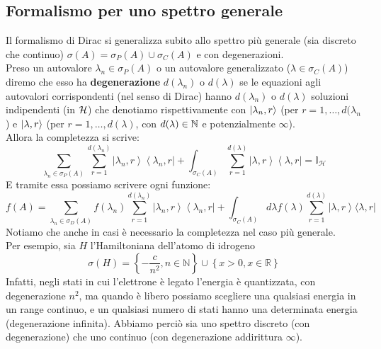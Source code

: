 \documentclass[../../FisicaTeorica.tex]{subfiles}
\begin{document}
\subsection{Formalismo per uno spettro generale}
Il formalismo di Dirac si generalizza subito allo spettro più generale (sia discreto che continuo) $\sigma \left(A\right)= \sigma_P(A)\cup \sigma_C\left(A\right)$ e con degenerazioni.\\
Preso un autovalore $\lambda_n\in \sigma_P(A)$ o un autovalore generalizzato ($\lambda \in \sigma_C(A)$) diremo che esso ha \textbf{degenerazione} $d(\lambda_n)$ o $d\left(\lambda\right)$ se le equazioni agli autovalori corrispondenti (nel senso di Dirac) hanno $d\left(\lambda_n\right)$ o $d\left(\lambda\right)$ soluzioni indipendenti (in $\mathcal{H}$) che denotiamo rispettivamente con $\ket{\lambda_{n}, r}$ (per $r=1,\dots, d(\lambda_n$) e $\ket{\lambda, r}$ (per $r = 1,\dots, d(\lambda)$, con $d(\lambda) \in \mathbb{N}$ e potenzialmente $\infty$).\\ 
Allora la completezza si scrive:
\[
\sum_{\lambda_n\in\sigma_P\left(A\right)}\sum_{r=1}^{d\left(\lambda_n\right)}{\left|\lambda_n,r\right\rangle\left\langle\lambda_n,r\right|+\int_{\sigma_C\left(A\right)}\sum_{r=1}^{d\left(\lambda\right)}\left|\lambda,r\right\rangle\left\langle\lambda,r\right|=\mathbb{I}_\mathcal{H}}
\]
E tramite essa possiamo scrivere ogni funzione:
\[
f\left(A\right)= \sum_{\lambda_n\in\sigma_D\left(A\right)} f\left(\lambda_n\right)\sum_{r=1}^{d\left(\lambda_n\right)}\left|\lambda_n,r\right\rangle\left\langle\lambda_n,r\right|+\int_{\sigma_C\left(A\right)}{d\lambda f\left(\lambda\right)}\sum_{r=1}^{d\left(\lambda\right)}{\left|\lambda,r\right\rangle\langle\lambda,r|}
\]
Notiamo che anche in casi  è necessario la completezza nel caso più generale.\\
Per esempio, sia $H$ l'Hamiltoniana dell'atomo di idrogeno 
\[
\sigma \left(H\right)=\left\{-\frac{c}{n^2},n\in\mathbb{N}\right\}\cup \left\{x>0,x\in\mathbb{R}\right\}
\]
Infatti, negli stati in cui l'elettrone è legato l'energia è quantizzata, con degenerazione $n^2$, ma quando è libero possiamo scegliere una qualsiasi energia in un range continuo, e un qualsiasi numero di stati hanno una determinata energia (degenerazione infinita). Abbiamo perciò sia uno spettro discreto (con degenerazione) che uno continuo (con degenerazione addirittura $\infty$).
\end{document}
